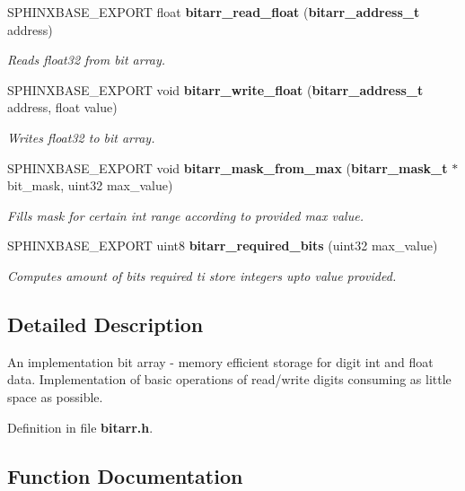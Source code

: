 \begin{DoxyCompactItemize}
S\-P\-H\-I\-N\-X\-B\-A\-S\-E\-\_\-\-E\-X\-P\-O\-R\-T float {\bf bitarr\-\_\-read\-\_\-float} ({\bf bitarr\-\_\-address\-\_\-t} address)
\begin{DoxyCompactList}\small\item\em Reads float32 from bit array. \end{DoxyCompactList}\item 
S\-P\-H\-I\-N\-X\-B\-A\-S\-E\-\_\-\-E\-X\-P\-O\-R\-T void {\bf bitarr\-\_\-write\-\_\-float} ({\bf bitarr\-\_\-address\-\_\-t} address, float value)
\begin{DoxyCompactList}\small\item\em Writes float32 to bit array. \end{DoxyCompactList}\item 
S\-P\-H\-I\-N\-X\-B\-A\-S\-E\-\_\-\-E\-X\-P\-O\-R\-T void {\bf bitarr\-\_\-mask\-\_\-from\-\_\-max} ({\bf bitarr\-\_\-mask\-\_\-t} $\ast$bit\-\_\-mask, uint32 max\-\_\-value)
\begin{DoxyCompactList}\small\item\em Fills mask for certain int range according to provided max value. \end{DoxyCompactList}\item 
S\-P\-H\-I\-N\-X\-B\-A\-S\-E\-\_\-\-E\-X\-P\-O\-R\-T uint8 {\bf bitarr\-\_\-required\-\_\-bits} (uint32 max\-\_\-value)
\begin{DoxyCompactList}\small\item\em Computes amount of bits required ti store integers upto value provided. \end{DoxyCompactList}\end{DoxyCompactItemize}


\subsection{Detailed Description}
An implementation bit array -\/ memory efficient storage for digit int and float data. Implementation of basic operations of read/write digits consuming as little space as possible. 

Definition in file {\bf bitarr.\-h}.



\subsection{Function Documentation}
